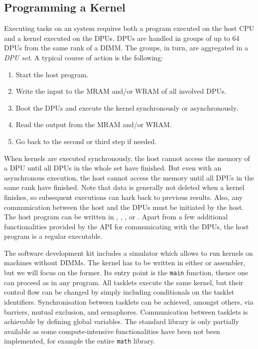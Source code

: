 \subsection{Programming a Kernel}
\label{sec:prereq:arch:code}

Executing tasks on an \upmem{} system requires both a program executed on the host \ac{CPU} and a kernel executed on the \acp{DPU}.
\Acp{DPU} are handled in groups of up to 64 \acp{DPU} from the same rank of a \ac{DIMM}.
The groups, in turn, are aggregated in a \emph{\ac{DPU} set}.
A typical course of action is the following:
\begin{enumerate}
	\item
	Start the host program.

	\item
	Write the input to the \ac{MRAM} and/or \ac{WRAM} of all involved \acp{DPU}.

	\item
	Boot the \acp{DPU} and execute the kernel synchronously or asynchronously.

	\item
	Read the output from the \ac{MRAM} and/or \ac{WRAM}.

	\item
	Go back to the second or third step if needed.
\end{enumerate}
When kernels are executed synchronously, the host cannot access the memory of a \ac{DPU} until all \acp{DPU} in the whole set have finished.
But even with an asynchronous execution, the host cannot access the memory until all \acp{DPU} in the same rank have finished.
Note that data is generally not deleted when a kernel finishes, so subsequent executions can hark back to previous results.
Also, any communication between the host and the \acp{DPU} must be initiated by the host.
The host program can be written in \langC{}, \langCpp{}, \langJava{}, or \langPython{}.
Apart from a few additional functionalities provided by the \upmem{} \ac{API} for communicating with the \acp{DPU}, the host program is a regular executable.

The software development kit includes a simulator which allows to run kernels on machines without \upmem{} \acp{DIMM}.
The kernel has to be written in either \langC{} or assembler, but we will focus on the former.
Its entry point is the \lstinline|main| function, thence one can proceed as in any \langC{} program.
All tasklets execute the same kernel, but their control flow can be changed by simply including conditionals on the tasklet identifiers.
Synchronisation between tasklets can be achieved, amongst others, via barriers, mutual exclusion, and semaphores.
Communication between tasklets is achievable by defining global variables.
The \langC{} standard library is only partially available as some compute-intensive functionalities have been not been implemented, for example the entire \lstinline|math| library.

